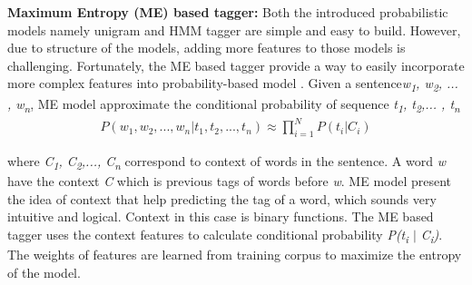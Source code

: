 \textbf{Maximum Entropy (ME) based tagger:} Both the introduced probabilistic models namely unigram and HMM tagger are simple and easy to build. However, due to structure of the models, adding more features to those models is challenging. Fortunately, the ME based tagger provide a way to easily incorporate more complex features into probability-based model \cite{Ratnaparkhi1996}. Given a sentence\textit{w\textsubscript{1}, w\textsubscript{2}, ... , w\textsubscript{n}}, ME model approximate the conditional probability of sequence \textit{t\textsubscript{1}, t\textsubscript{2},... , t\textsubscript{n}}
\begin{eqnarray*}
P(w_{1}, w_{2},... , w_{n} \vert t_{1}, t_{2},... , t_{n}) \approx \prod_{i=1}^{N} P(t_{i} \vert C_{i})
\end{eqnarray*}

where \textit{C\textsubscript{1}, C\textsubscript{2},..., C\textsubscript{n}} correspond to context of words in the sentence. A word \textit{w} have the context \textit{C} which is previous tags of words before \textit{w}. ME model present the idea of context that help predicting the tag of a word, which sounds very intuitive and logical. Context in this case is binary functions. The ME based tagger uses the context features to calculate conditional probability \textit{P(t\textsubscript{i} $\vert$ C\textsubscript{i})}. The weights of features are learned from training corpus to maximize the entropy of the model. 



